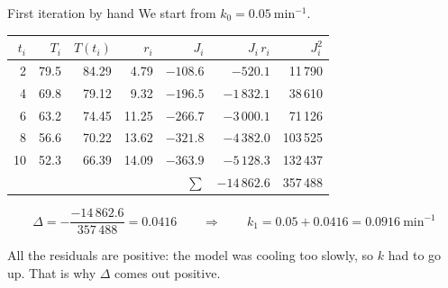 \documentclass[aspectratio=169,10pt]{beamer}
\begin{document}
\begin{frame}{First iteration by hand}
  We start from $k_0 = 0.05\ \text{min}^{-1}$.
  \medskip

  \centering\small
  \begin{tabular}{rrrrrrr}
    \toprule
    $t_i$ & $T_i$ & $T(t_i)$ & $r_i$ & $J_i$ & $J_i\,r_i$ & $J_i^2$ \\
    \midrule
    2  & 79.5 & 84.29 & 4.79  & $-108.6$ & $-520.1$     & 11\,790 \\
    4  & 69.8 & 79.12 & 9.32  & $-196.5$ & $-1\,832.1$  & 38\,610 \\
    6  & 63.2 & 74.45 & 11.25 & $-266.7$ & $-3\,000.1$  & 71\,126 \\
    8  & 56.6 & 70.22 & 13.62 & $-321.8$ & $-4\,382.0$  & 103\,525 \\
    10 & 52.3 & 66.39 & 14.09 & $-363.9$ & $-5\,128.3$  & 132\,437 \\
    \midrule
    \multicolumn{5}{r}{$\sum$} & $-14\,862.6$ & 357\,488 \\
    \bottomrule
  \end{tabular}
  \medskip

  \begin{ecuacion}
    \[ \Delta = -\frac{-14\,862.6}{357\,488} = 0.0416
       \qquad\Longrightarrow\qquad k_1 = 0.05 + 0.0416 = 0.0916\ \text{min}^{-1} \]
  \end{ecuacion}
  \raggedright
  All the residuals are positive: the model was cooling too slowly, so $k$ had to go up. That is why $\Delta$ comes out positive.
\end{frame}
\end{document}
